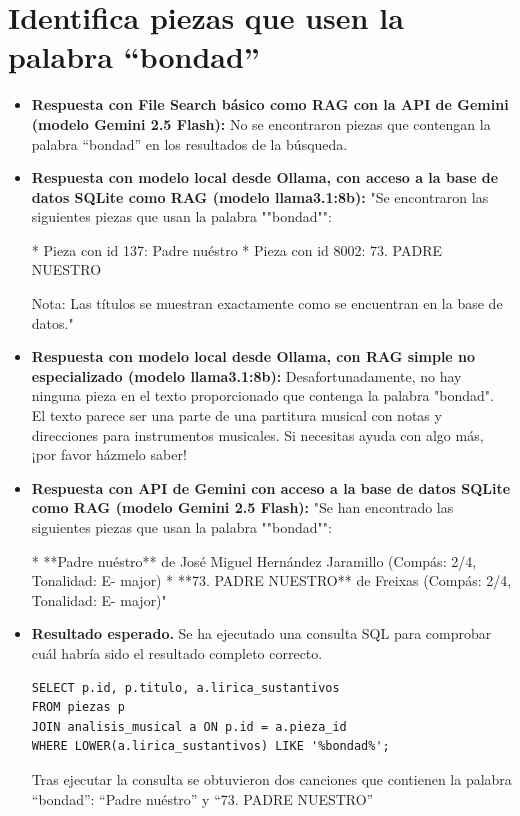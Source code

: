\section{Identifica piezas que usen la palabra ``bondad''}
\begin{itemize}
    \item \textbf{Respuesta con File Search básico como RAG con la API de Gemini (modelo Gemini 2.5 Flash):} No se encontraron piezas que contengan la palabra ``bondad'' en los resultados de la búsqueda.
    \item \textbf{Respuesta con modelo local desde Ollama, con acceso a la base de datos SQLite como RAG (modelo llama3.1:8b):} "Se encontraron las siguientes piezas que usan la palabra ""bondad"":

* Pieza con id 137: Padre nuéstro
* Pieza con id 8002: 73. PADRE NUESTRO 

Nota: Las títulos se muestran exactamente como se encuentran en la base de datos."
\item \textbf{Respuesta con modelo local desde Ollama, con RAG simple no especializado (modelo llama3.1:8b):} Desafortunadamente, no hay ninguna pieza en el texto proporcionado que contenga la palabra "bondad". El texto parece ser una parte de una partitura musical con notas y direcciones para instrumentos musicales. Si necesitas ayuda con algo más, ¡por favor házmelo saber!
\item \textbf{Respuesta con API de Gemini con acceso a la base de datos SQLite como RAG (modelo Gemini 2.5 Flash):} "Se han encontrado las siguientes piezas que usan la palabra ""bondad"":

*   **Padre nuéstro** de José Miguel Hernández Jaramillo (Compás: 2/4, Tonalidad: E- major)
*   **73. PADRE NUESTRO** de Freixas (Compás: 2/4, Tonalidad: E- major)"
\item \textbf{Resultado esperado.} Se ha ejecutado una consulta SQL para comprobar cuál habría sido el resultado completo correcto.
    \begin{verbatim}
SELECT p.id, p.titulo, a.lirica_sustantivos
FROM piezas p
JOIN analisis_musical a ON p.id = a.pieza_id
WHERE LOWER(a.lirica_sustantivos) LIKE '%bondad%';
    \end{verbatim}    
    Tras ejecutar la consulta se obtuvieron dos canciones que contienen la palabra ``bondad'': ``Padre nuéstro'' y ``73. PADRE NUESTRO'' 

\end{itemize}

